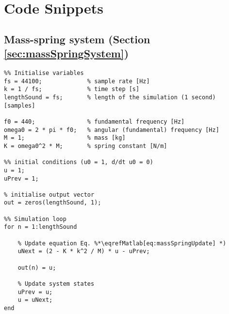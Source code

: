 \chapter{Code Snippets}

\section{Mass-spring system (Section \ref{sec:massSpringSystem})}\label{app:massSpringCode}

\setlstMAT
\begin{lstlisting}
%% Initialise variables
fs = 44100;             % sample rate [Hz]
k = 1 / fs;             % time step [s]
lengthSound = fs;       % length of the simulation (1 second) [samples]

f0 = 440;               % fundamental frequency [Hz]
omega0 = 2 * pi * f0;   % angular (fundamental) frequency [Hz]
M = 1;                  % mass [kg]
K = omega0^2 * M;       % spring constant [N/m]

%% initial conditions (u0 = 1, d/dt u0 = 0)
u = 1;                  
uPrev = 1;

% initialise output vector
out = zeros(lengthSound, 1);

%% Simulation loop
for n = 1:lengthSound
    
    % Update equation Eq. %*\eqrefMatlab[eq:massSpringUpdate] *)
    uNext = (2 - K * k^2 / M) * u - uPrev; 
    
    out(n) = u;
    
    % Update system states
    uPrev = u;
    u = uNext;
end    
\end{lstlisting}

